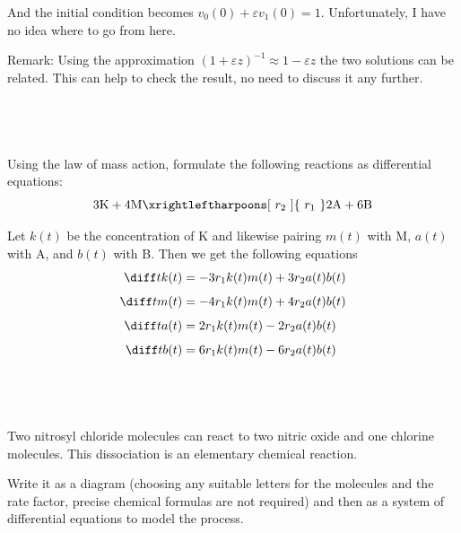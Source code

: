 \documentclass[a4paper]{article}
\begin{document}
And the initial condition becomes $v_0(0) + \varepsilon v_1(0) = 1$. Unfortunately, I have no idea where to go from here.

\vspace{3em}
\begin{questionbody}
Remark: Using the approximation $(1 + \varepsilon z)^{-1} \approx 1 - \varepsilon z$ the two solutions can be related. This can help to check the result, no need to discuss it any further.
\end{questionbody}


\subsection{~} %

\begin{questionbody}
Using the law of mass action, formulate the following reactions as differential equations: \[
3\text{K} + 4\text{M} \xrightleftharpoons[\ r_2\ ]{\ r_1\ } 2\text{A} + 6\text{B}
\]
\end{questionbody}

Let $k(t)$ be the concentration of K and likewise pairing $m(t)$ with M, $a(t)$ with A, and $b(t)$ with B. Then we get the following equations \begin{align*}
	\diff t k(t) &= -3 r_1 k(t) m(t) + 3 r_2 a(t) b(t)\\[1ex]
	\diff t m(t) &= -4 r_1 k(t) m(t) + 4 r_2 a(t) b(t)\\[1ex]
	\diff t a(t) &= 2 r_1 k(t) m(t) - 2 r_2 a(t) b(t)\\[1ex]
	\diff t b(t) &= 6 r_1 k(t) m(t) - 6 r_2 a(t) b(t)
\end{align*}

\subsection{~} %

\begin{questionbody}
Two nitrosyl chloride molecules can react to two nitric oxide and one chlorine molecules. This dissociation is an elementary chemical reaction.

Write it as a diagram (choosing any suitable letters for the molecules and the rate factor, precise chemical formulas are not required) and then as a system of differential equations to model the process.
\end{questionbody}
\end{document}
